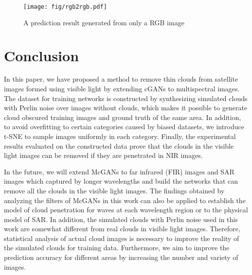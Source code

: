 \documentclass[10pt,twocolumn,letterpaper]{article}
\begin{document}
\begin{figure*}[h!]
\begin{center}
\hspace*{0mm}\texttt{[image: fig/rgb2rgb.pdf]}
\vspace{-2mm}

\caption{A prediction result generated from only a RGB image}
\label{fig:rgb2rgb}
\vspace{-3mm}
\end{center}
\end{figure*}



\section{Conclusion}
In this paper, we have proposed a method to remove thin clouds from satellite images formed using visible light by extending cGANs to multispectral images. 
The dataset for training networks is constructed by synthesizing simulated clouds with Perlin noise over images without clouds, which makes it possible to generate cloud obscured training images and ground truth of the same area.  
In addition, to avoid overfitting to certain categories caused by biased datasets, we introduce t-SNE to sample images uniformly in each category. 
Finally, the experimental results evaluated on the constructed data prove that the clouds in the visible light images can be removed if they are penetrated in NIR images.

In the future, we will extend McGANs to far infrared (FIR) images and SAR images which captured by longer wavelengths and build the networks that can remove all the clouds in the visible light images. 
The findings obtained by analyzing the filters of McGANs in this work can also be applied to establish the model of cloud penetration for waves at each wavelength region or to the physical model of SAR. 
In addition, the simulated clouds with Perlin noise used in this work are somewhat different from real clouds in visible light images. 
Therefore, statistical analysis of actual cloud images is necessary to improve the reality of the simulated clouds for training data. 
Furthermore, we aim to improve the prediction accuracy for different areas by increasing the number and variety of images.








\end{document}
